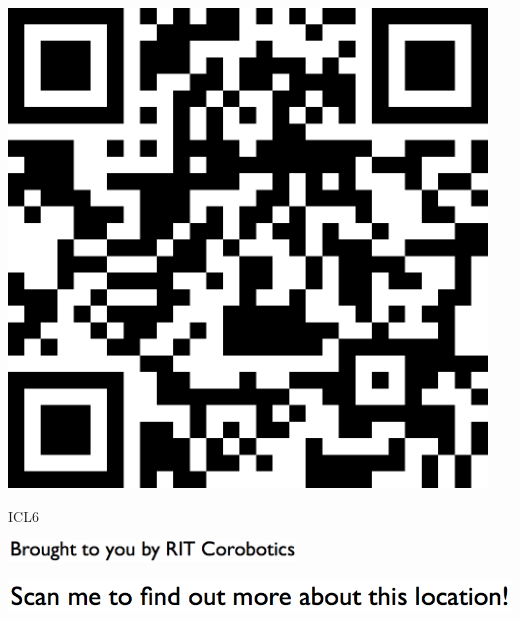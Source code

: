 \documentclass[letterpaper]{article}
\begin{document}
 \begingroup 
 \centerline{\includegraphics[scale=1,width=5in,height=5in]{ICL6.png}} 
 \endgroup 
 \vspace*{\fill} 

 \hfill{\small ICL6} 

  \vspace{0.7in} 
 
 \centerline{\includegraphics[scale=1,width=3in]{text-bottom.png}} 
 
 \pagebreak 
{} 
 \vspace*{\fill} 
 
  \centerline{\includegraphics[scale=1,width=6in]{text-top.png}} 
 
 \vspace{0.5in} 
 
\end{document}
